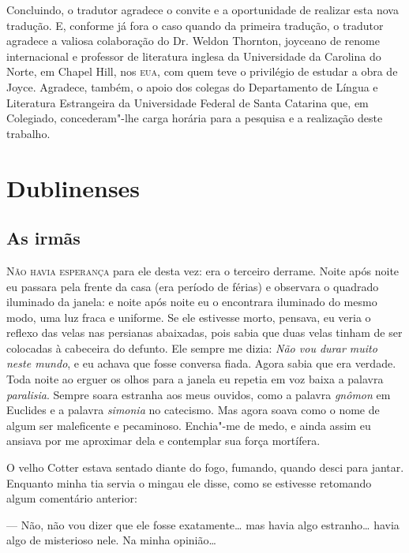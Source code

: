 Concluindo, o tradutor agradece o convite e a oportunidade de
realizar esta nova tradução.  E, conforme já fora o caso quando da primeira
tradução, o tradutor agradece a valiosa colaboração do Dr. Weldon Thornton,
joyceano de renome internacional e professor de literatura inglesa da
Universidade da Carolina do Norte, em Chapel Hill, nos \textsc{eua}, com quem teve o
privilégio de estudar a obra de Joyce.  Agradece, também, o apoio dos colegas
do Departamento de Língua e Literatura Estrangeira da Universidade Federal de
Santa Catarina que, em Colegiado, concederam"-lhe carga horária para a pesquisa
e a realização deste trabalho.

\part{Dublinenses}


\chapter{As irmãs}


\textsc{Não havia esperança} para ele desta vez: era o terceiro derrame.  Noite
após noite eu passara pela frente da casa (era período de férias) e observara o
quadrado iluminado da janela: e noite após noite eu o encontrara iluminado do
mesmo modo, uma luz fraca e uniforme.  Se ele estivesse morto, pensava, eu
veria o reflexo das velas nas persianas abaixadas, pois sabia que duas velas
tinham de ser colocadas à cabeceira do defunto.  Ele sempre me dizia:
\textit{Não vou durar muito neste mundo}, e eu achava que fosse conversa fiada.
Agora sabia que era verdade.  Toda noite ao erguer os olhos para a janela eu
repetia em voz baixa a palavra \textit{paralisia}.  Sempre soara estranha aos
meus ouvidos, como a palavra \textit{gnômon} em Euclides e a palavra
\textit{simonia} no catecismo.  Mas agora soava como o nome de algum ser
maleficente e pecaminoso.  Enchia"-me de medo, e ainda assim eu ansiava por me
aproximar dela e contemplar sua força mortífera.

O velho Cotter estava sentado diante do fogo, fumando, quando desci para
jantar.  Enquanto minha tia servia o mingau ele disse, como se estivesse
retomando algum comentário anterior:

--- Não, não vou dizer que ele fosse exatamente\ldots{} mas havia algo
estranho\ldots{} havia algo de misterioso nele.  Na minha opinião\ldots{}

